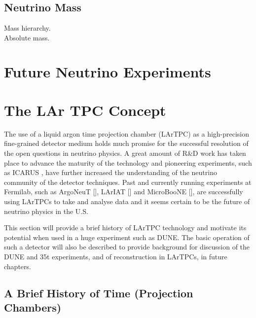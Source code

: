 \subsection{Neutrino Mass}\label{sec:NeutrinoMass}

Mass hierarchy.\\
Absolute mass.\\


\section{Future Neutrino Experiments}\label{sec:FutureNeutrinoExperiments}

\section{The LAr TPC Concept}\label{sec:LArTPC}

The use of a liquid argon time projection chamber (LArTPC) as a high-precision fine-grained detector medium holds much promise for the successful resolution of the open questions in neutrino physics.  A great amount of R\&D work has taken place to advance the maturity of the technology and pioneering experiments, such as ICARUS \cite{ICARUS2004}, have further increased the understanding of the neutrino community of the detector techniques.  Past and currently running experiments at Fermilab, such as ArgoNeuT [], LArIAT [] and MicroBooNE [], are successfully using LArTPCs to take and analyse data and it seems certain to be the future of neutrino physics in the U.S.

This section will provide a brief history of LArTPC technology and motivate its potential when used in a huge experiment such as DUNE.  The basic operation of such a detector will also be described to provide background for discussion of the DUNE and 35t experiments, and of reconstruction in LArTPCs, in future chapters.

\subsection{A Brief History of Time (Projection Chambers)}\label{sec:LArTPCHistory}

